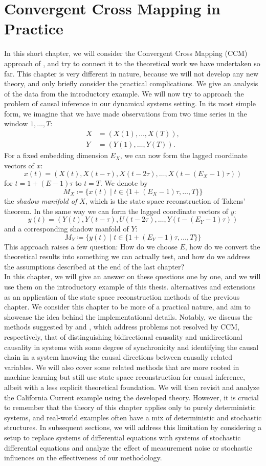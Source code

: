 \documentclass[11pt, a4paper]{memoir}
\theoremstyle{break}
\theoremstyle{break}
\theoremstyle{nonumberplain}
\begin{document}
\chapter{Convergent Cross Mapping in Practice}\label{chapTaken}
In this short chapter, we will consider the Convergent Cross Mapping (CCM) approach of \cite{Sugihara}, and try to connect it to the theoretical work we have undertaken so far. This chapter is very different in nature, because we will not develop any new theory, and only briefly consider the practical complications. We give an analysis of the data from the introductory example. We will now try to approach the problem of causal inference in our dynamical systems setting. In its most simple form, we imagine that we have made observations from two time series in the window $1,\ldots,T$:
\begin{align*}
X&=(X(1),\ldots, X(T)),\\
Y&=(Y(1),\ldots, Y(T)).
\end{align*}
For a fixed embedding dimension $E_X$, we can now form the lagged coordinate vectors of $x$:
$$x(t)=(X(t), X(t-\tau),X(t-2\tau),\ldots, X(t-(E_X-1)\tau))$$
for $t=1+(E-1)\tau$ to $t=T$. We denote by
$$M_X\coloneqq\{x(t)\mid t\in \{1+(E_X-1)\tau,\ldots,T\}\}$$
the \emph{shadow manifold of $X$}, which is the state space reconstruction of Takens' theorem. In the same way we can form the lagged coordinate vectors of $y$:
$$y(t)=(Y(t),Y(t-\tau),U(t-2\tau),\ldots,Y(t-(E_Y-1)\tau))$$
and a corresponding shadow manfold of $Y$:
$$M_Y\coloneqq\{y(t)\mid t\in \{1+(E_Y-1)\tau,\ldots,T\}\}$$
 This approach raises a few question: How do we choose $E$, how do we convert the theoretical results into something we can actually test, and how do we address the assumptions described at the end of the last chapter?\\[5pt]
In this chapter, we will give an answer on these questions one by one, and we will use them on the introductory example of this thesis. 
 alternatives and extensions as an application of the state space reconstruction methods of the previous chapter. We consider this chapter to be more of a practical nature, and aim to showcase the idea behind the implementational details. Notably, we discuss the methods suggested by \cite{Ye2015} and \cite{Leng2020}, which address problems not resolved by CCM, respectively, that of distinguishing bidirectional causality and unidirectional causality in systems with some degree of synchronicity and identifying the causal chain in a system knowing the causal directions between causally related variables. We will also cover some related methods that are more rooted in machine learning but still use state space reconstruction for causal inference, albeit with a less explicit theoretical foundation. We will then revisit and analyze the California Current example using the developed theory. However, it is crucial to remember that the theory of this chapter applies only to purely deterministic systems, and real-world examples often have a mix of deterministic and stochastic structures. In subsequent sections, we will address this limitation by considering a setup to replace systems of differential equations with systems of stochastic differential equations and analyze the effect of measurement noise or stochastic influences on the effectiveness of our methodology.
\end{document}
